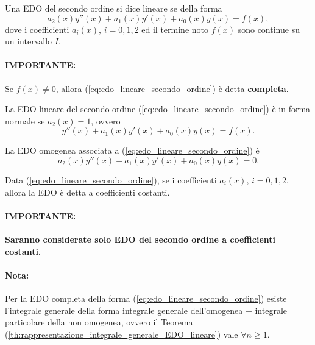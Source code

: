 \begin{definition}
    Una EDO del secondo ordine si dice lineare se della forma
    \begin{equation}\label{eq:edo_lineare_secondo_ordine}
        a_2(x)y''(x)+a_1(x)y'(x)+a_0(x)y(x) = f(x),
    \end{equation}
    dove i coefficienti $a_i(x),\, i=0,1,2$ ed il termine noto $f(x)$ sono continue su un intervallo $I$.
\end{definition}

\paragraph{IMPORTANTE:} Se $f(x)\neq 0$, allora (\ref{eq:edo_lineare_secondo_ordine}) è detta \textbf{completa}.

\begin{definition}
    La EDO lineare del secondo ordine (\ref{eq:edo_lineare_secondo_ordine}) è in forma normale se $a_2(x)=1$, ovvero
    \begin{equation}\label{eq:edo_lineare_secondo_ordine_forma_normale}
        y''(x)+a_1(x)y'(x)+a_0(x)y(x) = f(x).
    \end{equation}
\end{definition}

\begin{definition}
    La EDO omogenea associata a (\ref{eq:edo_lineare_secondo_ordine}) è
    \begin{equation}\label{eq:edo_omogenea_associata_lineare_secondo_ordine}
        a_2(x)y''(x)+a_1(x)y'(x)+a_0(x)y(x) = 0.
    \end{equation}
\end{definition}

\begin{definition}
    Data (\ref{eq:edo_lineare_secondo_ordine}), se i coefficienti $a_i(x),\, i=0,1,2$, allora la EDO è detta a coefficienti costanti.
\end{definition}

\paragraph{IMPORTANTE:} \textbf{Saranno considerate solo EDO del secondo ordine a coefficienti costanti.}

\paragraph{Nota:} Per la EDO completa della forma (\ref{eq:edo_lineare_secondo_ordine}) esiste l'integrale generale della forma integrale generale dell'omogenea + integrale particolare della non omogenea, ovvero il Teorema (\ref{th:rappresentazione_integrale_generale_EDO_lineare}) vale $\forall n\geq1$.


